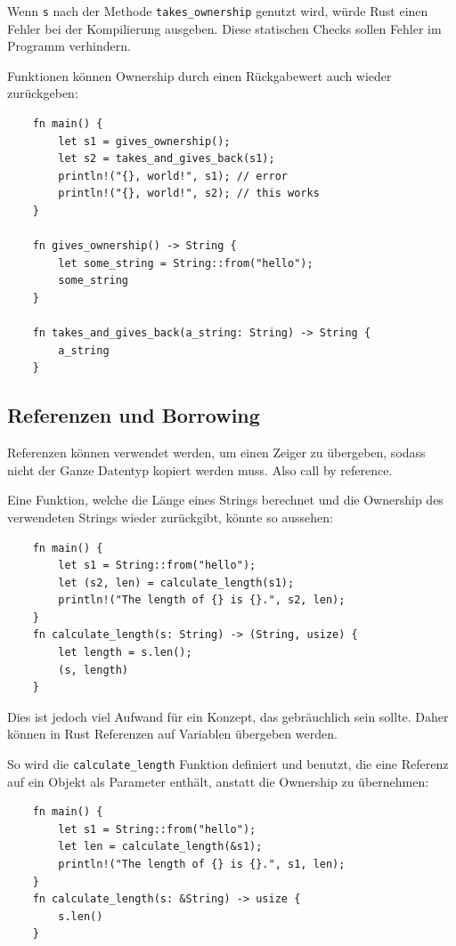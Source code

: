 Wenn \verb"s" nach der Methode \verb"takes_ownership" genutzt wird, würde Rust einen Fehler bei der Kompilierung ausgeben. Diese statischen Checks sollen Fehler im Programm verhindern.

Funktionen können Ownership durch einen Rückgabewert auch wieder zu\-rück\-ge\-ben:

\begin{lstlisting}
    fn main() {
        let s1 = gives_ownership();
        let s2 = takes_and_gives_back(s1);
        println!("{}, world!", s1); // error
        println!("{}, world!", s2); // this works
    }

    fn gives_ownership() -> String {
        let some_string = String::from("hello");
        some_string
    }

    fn takes_and_gives_back(a_string: String) -> String {
        a_string
    }
\end{lstlisting}

\subsection{Referenzen und Borrowing}\label{chap:ref}

Referenzen können verwendet werden, um einen Zeiger zu übergeben, sodass nicht der Ganze Datentyp kopiert werden muss. Also \glqq call by reference\grqq{}.

Eine Funktion, welche die Länge eines Strings berechnet und die Ownership des verwendeten Strings wieder zurückgibt, könnte so aussehen:

\begin{lstlisting}
    fn main() {
        let s1 = String::from("hello");
        let (s2, len) = calculate_length(s1);
        println!("The length of {} is {}.", s2, len);
    }
    fn calculate_length(s: String) -> (String, usize) {
        let length = s.len();
        (s, length)
    }
\end{lstlisting}

Dies ist jedoch viel Aufwand für ein Konzept, das gebräuchlich sein sollte. Daher können in Rust Referenzen auf Variablen übergeben werden.

So wird die \verb"calculate_length" Funktion definiert und benutzt, die eine Referenz auf ein Objekt als Parameter enthält, anstatt die Ownership zu übernehmen:

\begin{lstlisting}
    fn main() {
        let s1 = String::from("hello");
        let len = calculate_length(&s1);
        println!("The length of {} is {}.", s1, len);
    }
    fn calculate_length(s: &String) -> usize {
        s.len()
    }
\end{lstlisting}

